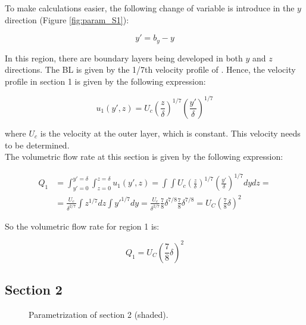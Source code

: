 To make calculations easier, the following change of variable is introduce in the $y$ direction (Figure \ref{fig:param_S1}):

\begin{equation}
\label{eq:zone1_change_of_variable}
y' = b_y - y
\end{equation}

In this region, there are boundary layers being developed in both $y$ and $z$ directions. The BL is given by the 1/7th velocity profile of . Hence, the velocity profile in section 1 is given by the following expression:

\begin{equation}
\label{eq:3DBL_profile_u1}
\boxed{
u_1 \left( y', z \right) = U_c \left( \frac{z}{\delta} \right)^{1/7} \left( \frac{y'}{\delta} \right)^{1/7}
}
\end{equation}

where $U_c$ is the velocity at the outer layer, which is constant. This velocity needs to be determined. \\

The volumetric flow rate at this section is given by the following expression:

\begin{equation}
\begin{split}
Q_1 &= \int_{y'=0}^{y'=\delta} \int_{z=0}^{z=\delta} u_1 \left( y', z  \right) = \int \int U_c \left( \frac{z}{\delta} \right)^{1/7} \left( \frac{y'}{\delta} \right)^{1/7} dy dz = \\
&= \frac{U_c}{\delta^{2/7}} \int z^{1/7} dz \int y'^{1/7} dy = \frac{U_c}{\delta^{2/7}} \frac{7}{8} \delta^{7/8} \frac{7}{8} \delta^{7/8} = U_C \left( \frac{7}{8} \delta \right)^2
\end{split}
\end{equation}

So the volumetric flow rate for region 1 is:

\begin{equation}
\label{eq:3DBL_Q1}
\boxed{
Q_1 = U_C \left( \frac{7}{8} \delta \right)^2
}
\end{equation}


\subsection*{Section 2}

\begin{figure}[h!]	
	\centering
%	
	\caption{Parametrization of section 2 (shaded).}
	\label{fig:param_S2}
\end{figure}

